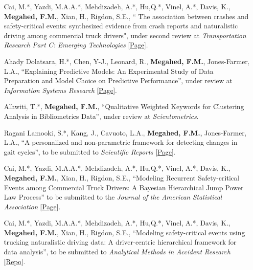 \documentclass[margin,line]{res}
\begin{document}
\begin{resume}
\vspace{-1.5mm}
Cai, M.*, Yazdi, M.A.A.*, Mehdizadeh, A.*, Hu,Q.*, Vinel, A.*, Davis, K., \textbf{Megahed, F.M.}, Xian, H., Rigdon, S.E., `` The association between crashes and safety-critical events: synthesized evidence from crash reports and naturalistic driving among commercial truck drivers", under second review at \textit{Transportation Research Part C: Emerging Technologies} [\faGithub \href{https://caimiao0714.github.io/Github-SCE-crash/}{Page}].

\vspace{-1.5mm}
Ahady Dolatsara, H.*, Chen, Y-J., Leonard, R., \textbf{Megahed, F.M.}, Jones-Farmer, L.A., ``Explaining Predictive Models: An Experimental Study of Data Preparation and Model Choice on Predictive Performance'', under review at \textit{Information Systems Research} [\faGithub \href{https://my-favor-research.github.io/ISR-Supplementary-Materials.github.io/}{Page}].

\vspace{-1.5mm}
Alhwiti, T.*, \textbf{Megahed, F.M.}, ``Qualitative Weighted Keywords for Clustering Analysis in Bibliometrics Data'', under review at \textit{Scientometrics}. 

\vspace{-1.5mm}
Ragani Lamooki, S.*, Kang, J., Cavuoto, L.A., \textbf{Megahed, F.M.}, Jones-Farmer, L.A., ``A personalized and non-parametric framework for detecting changes in gait cycles'', to be submitted to \textit{Scientific Reports} [\faGithub \href{https://fmegahed.github.io/gait_monitoring_hotelling}{Page}]. 

\vspace{-1.5mm}
Cai, M.*, Yazdi, M.A.A.*, Mehdizadeh, A.*, Hu,Q.*, Vinel, A.*, Davis, K., \textbf{Megahed, F.M.}, Xian, H., Rigdon, S.E., ``Modeling Recurrent Safety-critical Events among Commercial Truck Drivers: A Bayesian Hierarchical Jump Power Law Process'' to be submitted to the \textit{Journal of the American Statistical Association} [\faGithub \href{https://caimiao0714.github.io/JPLP/}{Page}].

\vspace{-1.5mm}
Cai, M.*, Yazdi, M.A.A.*, Mehdizadeh, A.*, Hu,Q.*, Vinel, A.*, Davis, K., \textbf{Megahed, F.M.}, Xian, H., Rigdon, S.E., ``Modeling safety-critical events using trucking naturalistic driving data: A driver-centric hierarchical framework for data analysis'', to be submitted to \textit{Analytical Methods in Accident Research} [\faGithub \href{https://github.com/caimiao0714/500TruckStudy}{Repo}].


\end{resume}
\end{document}
